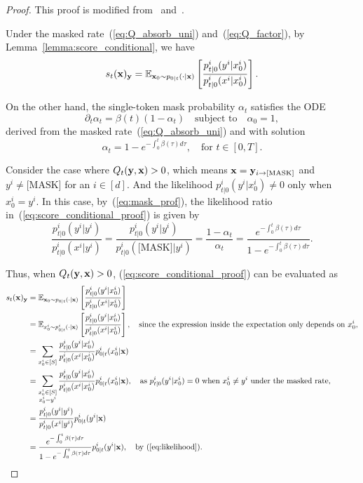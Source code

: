 \documentclass{article} %
\def\eqref#1{equation~\ref{#1}}
\newcommand{\bfx}{{\bf x}}
\newcommand{\bfy}{ {\bf y}}
\newcommand{\mask}{\text{[MASK]}}
\renewcommand{\eqref}[1]{\textup{(\ref{#1})}}
\begin{document}
\begin{proof}
    This proof is modified from~\cite[Lemma~1]{liang2026absorb} and~\cite[Theorem~1]{ou2025your}.

    Under the masked rate~\eqref{eq:Q_absorb_uni} and~\eqref{eq:Q_factor}, by Lemma~\ref{lemma:score_conditional}, we have
    \begin{equation}\label{eq:score_conditional_proof}
        s_t(\bfx)_\bfy = \mathbb{E}_{\bfx_0 \sim p_{0|t}(\cdot | \bfx)} \left[ \frac{p^i_{t|0}(y^i|x_0^i)}{p^i_{t|0}(x^i|x^i_0)} \right].
    \end{equation}

    On the other hand, the single-token
mask probability $\alpha_t$ satisfies the ODE
\[
    \partial_t \alpha_t = \beta(t)(1 - \alpha_t) \quad \text{subject to} \quad \alpha_0=1,
\]
derived from the masked rate~\eqref{eq:Q_absorb_uni} and with solution
\begin{equation}\label{eq:mask_prof}
    \alpha_t = 1-e^{-\int_0^t \beta(\tau) d\tau}, \quad \text{for } t\in[0, T].
\end{equation}

Consider the case where $Q_t(\bfy, \bfx)>0$, which means $\bfx=\bfy_{i \to \mask}$ and $y^i \neq \mask$ for an $i \in [d]$. And the likelihood $p^i_{t|0}(y^i|x_0^i) \neq 0$ only when $x_0^i=y^i$. In this case, by~\eqref{eq:mask_prof}, the likelihood ratio in~\eqref{eq:score_conditional_proof} is given by
\begin{equation}\label{eq:likelihood}
    \frac{p^i_{t|0}(y^i|y^i)}{p^i_{t|0}(x^i|y^i)} =\frac{p^i_{t|0}(y^i|y^i)}{p^i_{t|0}(\mask|y^i)}  = \frac{1-\alpha_t}{\alpha_t} = \frac{e^{-\int_0^t \beta(\tau) d\tau}}{1-e^{-\int_0^t \beta(\tau) d\tau}}.
\end{equation}

Thus, when $Q_t(\bfy, \bfx)>0$, \eqref{eq:score_conditional_proof} can be evaluated as
\begin{align*}
s_t(\bfx)_\bfy &= \mathbb{E}_{\bfx_0 \sim p_{0|t}(\cdot | \bfx)} \left[ \frac{p^i_{t|0}(y^i|x_0^i)}{p^i_{t|0}(x^i|x^i_0)} \right] \\
&= \mathbb{E}_{x^i_0 \sim p^i_{0|t}(\cdot | \bfx)} \left[ \frac{p^i_{t|0}(y^i|x_0^i)}{p^i_{t|0}(x^i|x^i_0)} \right], \quad \text{since the expression inside the expectation only depends on $x^i_0$,} \\
&= \sum_{x^i_0 \in [S]} \frac{p^i_{t|0}(y^i|x_0^i)}{p^i_{t|0}(x^i|x^i_0)} p^i_{0|t}(x^i_0 | \bfx) \\
&= \sum_{\substack{x^i_0 \in [S] \\ x_0^i=y^i}} \frac{p^i_{t|0}(y^i|x_0^i)}{p^i_{t|0}(x^i|x^i_0)} p^i_{0|t}(x^i_0 | \bfx), \quad \text{as $p^i_{t|0}(y^i|x_0^i)=0$ when $x_0^i\neq y^i$ under the masked rate,} \\
&=  \frac{p^i_{t|0}(y^i|y^i)}{p^i_{t|0}(x^i|y^i)} p^i_{0|t}(y^i | \bfx) \\
&= \frac{e^{-\int_0^t \beta(\tau) d\tau}}{1-e^{-\int_0^t \beta(\tau) d\tau}} p_{0|t}^i (y^i|\bfx), \quad \text{by~\eqref{eq:likelihood}.}
\end{align*}
\end{proof}
\end{document}
